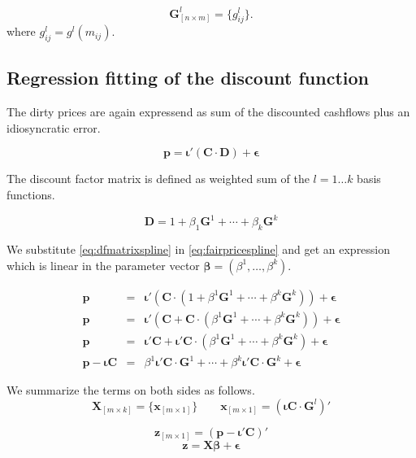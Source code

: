 \begin{equation}
\label{eq:basisfctmatrix}	
\bm{G}_{\left [n \times m\right]}^l= \{g_{ij}^l\}.
\end{equation}
where $g_{ij}^l=g^l(m_{ij})$.



\subsection{Regression fitting of the discount function}

The dirty prices are again expressend as sum of the discounted cashflows plus an idiosyncratic error.

\begin{equation}
  \label{eq:fairpricespline}
  \bm{p}= \bm{\iota}'\left(\bm{C}\cdot\bm{D}\right)+ \bm{\epsilon}
\end{equation}

The discount factor matrix is defined as weighted sum of the $l=1\dots k$ basis functions.

\begin{equation}
  \label{eq:dfmatrixspline}
   \bm{D}=1+\beta_1\bm{G}^1+\cdots + \beta_k\bm{G}^k
\end{equation}

We substitute \eqref{eq:dfmatrixspline} in \eqref{eq:fairpricespline} and get an expression which is linear in the parameter vector $\bm{\beta}=(\beta^1,\dots,\beta^k)$.

\begin{eqnarray*}
  \label{eq:splineparam}
  \bm{p} &=& \bm{\iota}'\left(\bm{C}\cdot\left(1+\beta^1\bm{G}^1+\cdots+\beta^k\bm{G}^k\right)\right)+\bm{\epsilon}\\
  \bm{p} &=& \bm{\iota}'\left(\bm{C}+\bm{C}\cdot\left(\beta^1\bm{G}^1+\cdots+\beta^k\bm{G}^k\right)\right)+\bm{\epsilon}\\
  \bm{p} &=& \bm{\iota}'\bm{C}+\bm{\iota}'\bm{C}\cdot\left(\beta^1\bm{G}^1+\cdots+\beta^k\bm{G}^k\right)+\bm{\epsilon}\\
  \bm{p}- \bm{\iota}\bm{C} &=& \beta^1\bm{\iota}'\bm{C}\cdot\bm{G}^1+\cdots+\beta^k\bm{\iota}'\bm{C}\cdot\bm{G}^k+\bm{\epsilon}
\end{eqnarray*}


We summarize the terms on both sides as follows.
	$$\bm{X}_{\left[m \times k\right]}=\{ \bm{x}_{\left[m \times 1\right]} \} \qquad  \bm{x}_{\left[m \times 1\right]} = \left( \bm{\iota}\bm{C}\cdot\bm{G}^l\right)'$$


	$$\bm{z}_{\left[m \times 1\right]}= \left(\bm{p}-\bm{\iota}'\bm{C}\right)'   $$
        \begin{equation}
          \label{eq:splinereg}
            \bm{z}=\bm{X}\bm{\beta}+\bm{\epsilon}
        \end{equation}
        
